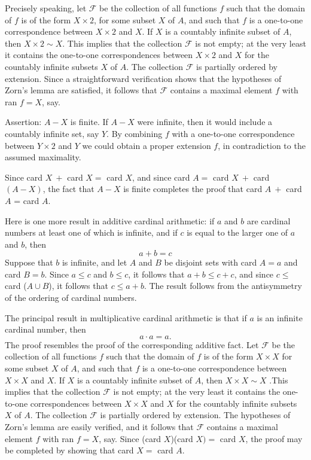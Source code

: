 Precisely speaking, let $\mathcal{F}$ be the collection of all functions $f$ such that the domain of $f$ is of the form $X \times 2$, for some subset $X$ of $A$, and such that $f$ is a one-to-one correspondence between $X \times 2$ and $X$. If $X$ is a countably infinite subset of $A$, then $X \times 2 \sim X$. This implies that the collection $\mathcal{F}$ is not empty; at the very least it contains the one-to-one correspondences between $X \times 2$ and $X$ for the countably infinite subsets $X$ of $A$. The collection $\mathcal{F}$ is partially ordered by extension. Since a straightforward verification shows that the hypotheses of Zorn's lemma are satisfied, it follows that $\mathcal{F}$ contains a maximal element $f$ with ran $f = X$, say. 

Assertion: $A - X$ is finite. If $A - X$ were infinite, then it would include a countably infinite set, say $Y$. By combining $f$ with a one-to-one correspondence between $Y \times 2$ and $Y$ we could obtain a proper extension $f$, in contradiction to the assumed maximality. 

Since card $X\ +$ card $X =$ card $X$, and since card $A = $ card $X\ +$ card $(A - X)$, the fact that $A - X$ is finite completes the proof that card $A\ +$ card $A$ = card $A$.

Here is one more result in additive cardinal arithmetic: if $a$ and $b$ are cardinal numbers at least one of which is infinite, and if $c$ is equal to the larger one of $a$ and $b$, then 
\begin{equation*}
a + b = c
\end{equation*}
Suppose that $b$ is infinite, and let $A$ and $B$ be disjoint sets with card $A = a$ and card $B = b$. Since $a \le c$ and $b \le c$, it follows that $a + b \le c + c$, and since $c \le$ card ($A \cup B$), it follows that $c \le a + b$. The result follows from the antisymmetry of the ordering of cardinal numbers. 

The principal result in multiplicative cardinal arithmetic is that if $a$ is an infinite cardinal number, then 
\begin{equation*}
a \cdot a = a. 
\end{equation*}
The proof resembles the proof of the corresponding additive fact. Let $\mathcal{F}$ be the collection of all functions $f$ such that the domain of $f$ is of the form $X \times X$ for some subset $X$ of $A$, and such that $f$ is a one-to-one correspondence between $X \times X$ and $X$. If $X$ is a countably infinite subset of $A$, then $X \times X \sim X$ .This implies that the collection $\mathcal{F}$ is not empty; at the very least it contains the one-to-one correspondences between $X \times X$ and $X$ for the countably infinite subsets $X$ of $A$. The collection $\mathcal{F}$ is partially ordered by extension. The hypotheses of Zorn's lemma are easily verified, and it follows that $\mathcal{F}$ contains a maximal element $f$ with ran $f = X$, say. Since (card $X$)(card $X) =$ card $X$, the proof may be completed by showing that card $X =$ card $A$. 

